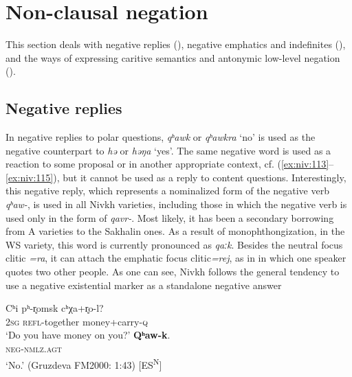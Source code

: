 \documentclass[output=paper,colorlinks,citecolor=brown]{langscibook}
\begin{document}
\section{Non-clausal negation}\label{sec:niv:3} 

This section deals with negative replies (), negative emphatics and indefinites (), and the ways of expressing caritive semantics and antonymic low-level negation ().

\subsection{Negative replies}\label{sec:niv:3.1} 

In negative replies to polar questions, \textit{qʰawk} or \textit{qʰawkra} ‘no’ is used as the negative counterpart to \textit{hǝ} or \textit{hǝŋa} ‘yes’. The same negative word is used as a reaction to some proposal or in another appropriate context, cf. (\ref{ex:niv:113}--\ref{ex:niv:115}), but it cannot be used as a reply to content questions. Interestingly, this negative reply, which represents a nominalized form of the negative verb \textit{qʰaw-}, is used in all Nivkh varieties, including those in which the negative verb is used only in the form of \textit{qavr-}. Most likely, it has been a secondary borrowing from A varieties to the Sakhalin ones. As a result of monophthongization, in the WS variety, this word is currently pronounced as \textit{qaːk}. Besides the neutral focus clitic \textit{=ra}, it can attach the emphatic focus clitic\textit{=rej}, as in  in which one speaker quotes two other people. As one can see, Nivkh follows the general tendency to use a negative existential marker as a standalone negative answer \citep{Veselinova2013neg.exist}

\ea\label{ex:niv:113}
    \begin{xlist}[Q: ]
    \label{ex:niv:113Q}
        \gll  Cʰi pʰ-r̥omsk cʰχa+r̥o-l?  \\ 
             2\textsc{sg} \textsc{refl}{}-together money+carry-\textsc{q} \\
        \glt ‘Do you have money on you?’
    \label{ex:niv:113A}
        \gll \textbf{Qʰaw-k}. \\ 
            \textsc{neg-nmlz.agt} \\
        \glt ‘No.’ (Gruzdeva FM2000: 1:43) [ES\textsuperscript{N}]
    \end{xlist}
\z 
\end{document}
